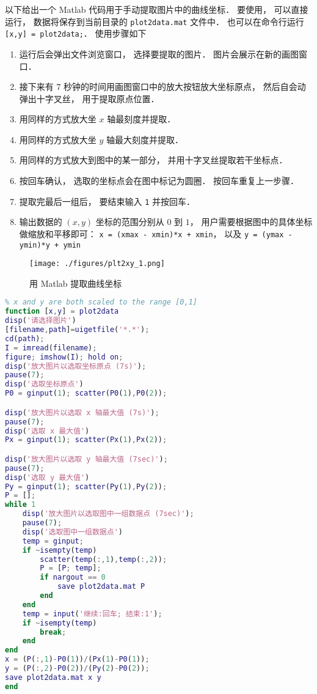 

以下给出一个 Matlab 代码用于手动提取图片中的曲线坐标． 要使用， 可以直接运行， 数据将保存到当前目录的 \verb|plot2data.mat| 文件中． 也可以在命令行运行 \verb|[x,y] = plot2data;|． 使用步骤如下

\begin{enumerate}
\item 运行后会弹出文件浏览窗口， 选择要提取的图片． 图片会展示在新的画图窗口．
\item 接下来有 7 秒钟的时间用画图窗口中的放大按钮放大坐标原点， 然后自会动弹出十字叉丝， 用于提取原点位置．
\item 用同样的方式放大坐 $x$ 轴最刻度并提取．
\item 用同样的方式放大坐 $y$ 轴最大刻度并提取．
\item 用同样的方式放大到图中的某一部分， 并用十字叉丝提取若干坐标点．
\item 按回车确认， 选取的坐标点会在图中标记为圆圈． 按回车重复上一步骤．
\item 提取完最后一组后， 要结束输入 \verb|1| 并按回车．
\item 输出数据的 $(x, y)$ 坐标的范围分别从 $0$ 到 $1$， 用户需要根据图中的具体坐标做缩放和平移即可： \verb|x = (xmax - xmin)*x + xmin|， 以及 \verb|y = (ymax - ymin)*y + ymin|
\end{enumerate}

\begin{figure}[ht]
\centering
\texttt{[image: ./figures/plt2xy\_1.png]}
\caption{用 Matlab 提取曲线坐标} \label{plt2xy_fig1}
\end{figure}

\begin{lstlisting}[language=matlab, caption=plot2data.m]
% Data Extractor for Plot
% x and y are both scaled to the range [0,1]
function [x,y] = plot2data
disp('请选择图片')
[filename,path]=uigetfile('*.*');
cd(path);
I = imread(filename);
figure; imshow(I); hold on;
disp('放大图片以选取坐标原点 (7s)');
pause(7);
disp('选取坐标原点')
P0 = ginput(1); scatter(P0(1),P0(2));

disp('放大图片以选取 x 轴最大值 (7s)');
pause(7);
disp('选取 x 最大值')
Px = ginput(1); scatter(Px(1),Px(2));

disp('放大图片以选取 y 轴最大值 (7sec)');
pause(7);
disp('选取 y 最大值')
Py = ginput(1); scatter(Py(1),Py(2));
P = [];
while 1
    disp('放大图片以选取图中一组数据点 (7sec)');
    pause(7);
    disp('选取图中一组数据点')
    temp = ginput;
    if ~isempty(temp)
        scatter(temp(:,1),temp(:,2));
        P = [P; temp];
        if nargout == 0
            save plot2data.mat P
        end
    end
    temp = input('继续:回车; 结束:1');
    if ~isempty(temp)
        break;
    end
end
x = (P(:,1)-P0(1))/(Px(1)-P0(1));
y = (P(:,2)-P0(2))/(Py(2)-P0(2));
save plot2data.mat x y
end
\end{lstlisting}
